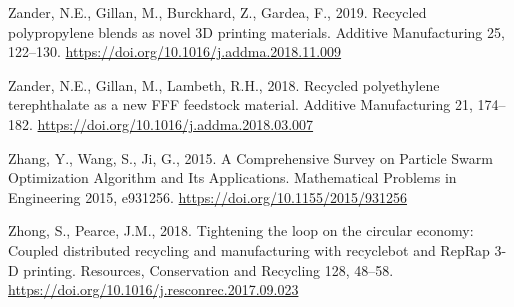 \documentclass[
  12pt,
  number,
  review]{elsarticle}
\newlength{\cslhangindent}
\newlength{\cslentryspacingunit} %
\newenvironment{CSLReferences}[2] %
 {%
  \setlength{\parindent}{0pt}
  \ifodd #1
  \let\oldpar\par
  \def\par{\hangindent=\cslhangindent\oldpar}
  \fi
  \setlength{\parskip}{#2\cslentryspacingunit}
 }%
 {}
\begin{document}
\begin{CSLReferences}{1}{0}
\leavevmode{}%
Zander, N.E., Gillan, M., Burckhard, Z., Gardea, F., 2019. Recycled
polypropylene blends as novel {3D} printing materials. Additive
Manufacturing 25, 122--130.
\url{https://doi.org/10.1016/j.addma.2018.11.009}

\leavevmode{}%
Zander, N.E., Gillan, M., Lambeth, R.H., 2018. Recycled polyethylene
terephthalate as a new {FFF} feedstock material. Additive Manufacturing
21, 174--182. \url{https://doi.org/10.1016/j.addma.2018.03.007}

\leavevmode{}%
Zhang, Y., Wang, S., Ji, G., 2015. A {Comprehensive Survey} on {Particle
Swarm Optimization Algorithm} and {Its Applications}. Mathematical
Problems in Engineering 2015, e931256.
\url{https://doi.org/10.1155/2015/931256}

\leavevmode{}%
Zhong, S., Pearce, J.M., 2018. Tightening the loop on the circular
economy: {Coupled} distributed recycling and manufacturing with
recyclebot and {RepRap} 3-{D} printing. Resources, Conservation and
Recycling 128, 48--58.
\url{https://doi.org/10.1016/j.resconrec.2017.09.023}

\end{CSLReferences}
\end{document}
